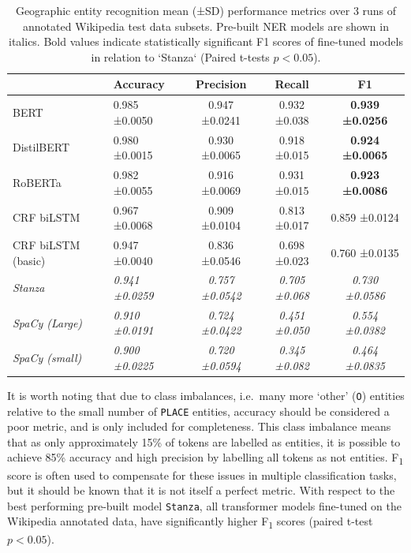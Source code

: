 \documentclass[
  letterpaper,
  11pt,
  english,
  onehalfspacing,
  headsepline]{MastersDoctoralThesis}
\begin{document}
\begin{table}

\caption{\label{tbl-eval}Geographic entity recognition mean (±SD) performance metrics over 3 runs of annotated Wikipedia test data subsets. Pre-built NER models are shown in italics. Bold values indicate statistically significant F1 scores of fine-tuned models in relation to `Stanza` (Paired t-tests $p<0.05$).}
\centering
\fontsize{9}{11}\selectfont
\begin{tabular}[t]{llccc}
\toprule
\textbf{ } & \textbf{Accuracy} & \textbf{Precision} & \textbf{Recall} & \textbf{F1}\\
\midrule
BERT & 0.985 ±0.0050 & 0.947 ±0.0241 & 0.932 ±0.038 & \textbf{0.939 ±0.0256}\\
DistilBERT & 0.980 ±0.0015 & 0.930 ±0.0065 & 0.918 ±0.015 & \textbf{0.924 ±0.0065}\\
RoBERTa & 0.982 ±0.0055 & 0.916 ±0.0069 & 0.931 ±0.015 & \textbf{0.923 ±0.0086}\\
CRF biLSTM & 0.967 ±0.0068 & 0.909 ±0.0104 & 0.813 ±0.017 & 0.859 ±0.0124\\
CRF biLSTM (basic) & 0.947 ±0.0040 & 0.836 ±0.0546 & 0.698 ±0.023 & 0.760 ±0.0135\\
\midrule
\em{Stanza} & \em{0.941 ±0.0259} & \em{0.757 ±0.0542} & \em{0.705 ±0.068} & \em{0.730 ±0.0586}\\
\em{SpaCy (Large)} & \em{0.910 ±0.0191} & \em{0.724 ±0.0422} & \em{0.451 ±0.050} & \em{0.554 ±0.0382}\\
\em{SpaCy (small)} & \em{0.900 ±0.0225} & \em{0.720 ±0.0594} & \em{0.345 ±0.082} & \em{0.464 ±0.0835}\\
\bottomrule
\end{tabular}
\end{table}

It is worth noting that due to class imbalances, i.e.~many more `other'
(\texttt{O}) entities relative to the small number of \texttt{PLACE}
entities, accuracy should be considered a poor metric, and is only
included for completeness. This class imbalance means that as only
approximately 15\% of tokens are labelled as entities, it is possible to
achieve 85\% accuracy and high precision by labelling all tokens as not
entities. F\textsubscript{1} score is often used to compensate for these
issues in multiple classification tasks, but it should be known that it
is not itself a perfect metric. With respect to the best performing
pre-built model \texttt{Stanza}, all transformer models fine-tuned on
the Wikipedia annotated data, have significantly higher
F\textsubscript{1} scores (paired t-test \(p<0.05\)).
\end{document}
